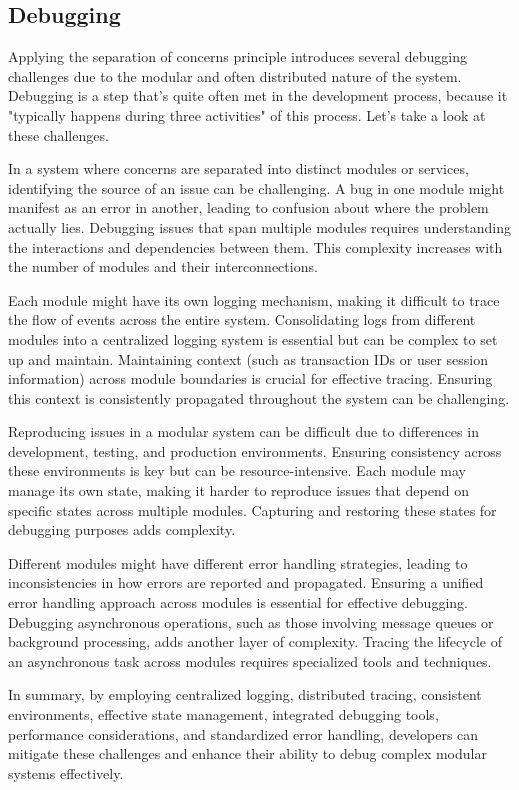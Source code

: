 \subsection{Debugging}
Applying the separation of concerns principle introduces several debugging challenges due to the modular and often distributed nature of the system. 
Debugging is a step that's quite often met in the development process, because it "typically happens during three activities" \cite{debugging} of this process.
Let's take a look at these challenges.
\par
In a system where concerns are separated into distinct modules or services, identifying the source of an issue can be challenging. A bug in one module might manifest as an error in another, leading to confusion about where the problem actually lies.
Debugging issues that span multiple modules requires understanding the interactions and dependencies between them. This complexity increases with the number of modules and their interconnections.
\par
Each module might have its own logging mechanism, making it difficult to trace the flow of events across the entire system. Consolidating logs from different modules into a centralized logging system is essential but can be complex to set up and maintain.
Maintaining context (such as transaction IDs or user session information) across module boundaries is crucial for effective tracing. Ensuring this context is consistently propagated throughout the system can be challenging.
\par
Reproducing issues in a modular system can be difficult due to differences in development, testing, and production environments. Ensuring consistency across these environments is key but can be resource-intensive.
Each module may manage its own state, making it harder to reproduce issues that depend on specific states across multiple modules. Capturing and restoring these states for debugging purposes adds complexity.
\par
Different modules might have different error handling strategies, leading to inconsistencies in how errors are reported and propagated. Ensuring a unified error handling approach across modules is essential for effective debugging.
Debugging asynchronous operations, such as those involving message queues or background processing, adds another layer of complexity. Tracing the lifecycle of an asynchronous task across modules requires specialized tools and techniques.
\par
In summary, by employing centralized logging, distributed tracing, consistent environments, effective state management, integrated debugging tools, performance considerations, and standardized error handling, developers can mitigate these challenges and enhance their ability to debug complex modular systems effectively.

\label{chap:ch3}
